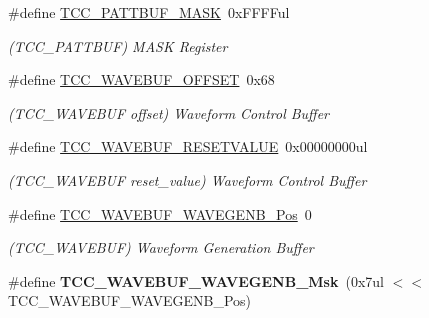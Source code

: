 \begin{DoxyCompactItemize}
\item 
\hypertarget{group___s_a_m_l21___t_c_c_gabbd3e6ebf10aa142b53d2ef5da3777bc}{}\#define \hyperlink{group___s_a_m_l21___t_c_c_gabbd3e6ebf10aa142b53d2ef5da3777bc}{T\+C\+C\+\_\+\+P\+A\+T\+T\+B\+U\+F\+\_\+\+M\+A\+S\+K}~0x\+F\+F\+F\+Ful\label{group___s_a_m_l21___t_c_c_gabbd3e6ebf10aa142b53d2ef5da3777bc}

\begin{DoxyCompactList}\small\item\em (T\+C\+C\+\_\+\+P\+A\+T\+T\+B\+U\+F) M\+A\+S\+K Register \end{DoxyCompactList}\item 
\hypertarget{group___s_a_m_l21___t_c_c_gae904588e02c9fc7371bdaa4c0c83fbce}{}\#define \hyperlink{group___s_a_m_l21___t_c_c_gae904588e02c9fc7371bdaa4c0c83fbce}{T\+C\+C\+\_\+\+W\+A\+V\+E\+B\+U\+F\+\_\+\+O\+F\+F\+S\+E\+T}~0x68\label{group___s_a_m_l21___t_c_c_gae904588e02c9fc7371bdaa4c0c83fbce}

\begin{DoxyCompactList}\small\item\em (T\+C\+C\+\_\+\+W\+A\+V\+E\+B\+U\+F offset) Waveform Control Buffer \end{DoxyCompactList}\item 
\hypertarget{group___s_a_m_l21___t_c_c_ga38a4ff54c2b170fb70df2ceb6c0d87ee}{}\#define \hyperlink{group___s_a_m_l21___t_c_c_ga38a4ff54c2b170fb70df2ceb6c0d87ee}{T\+C\+C\+\_\+\+W\+A\+V\+E\+B\+U\+F\+\_\+\+R\+E\+S\+E\+T\+V\+A\+L\+U\+E}~0x00000000ul\label{group___s_a_m_l21___t_c_c_ga38a4ff54c2b170fb70df2ceb6c0d87ee}

\begin{DoxyCompactList}\small\item\em (T\+C\+C\+\_\+\+W\+A\+V\+E\+B\+U\+F reset\+\_\+value) Waveform Control Buffer \end{DoxyCompactList}\item 
\hypertarget{group___s_a_m_l21___t_c_c_ga873098e9f57606f2bb54409caa7482f9}{}\#define \hyperlink{group___s_a_m_l21___t_c_c_ga873098e9f57606f2bb54409caa7482f9}{T\+C\+C\+\_\+\+W\+A\+V\+E\+B\+U\+F\+\_\+\+W\+A\+V\+E\+G\+E\+N\+B\+\_\+\+Pos}~0\label{group___s_a_m_l21___t_c_c_ga873098e9f57606f2bb54409caa7482f9}

\begin{DoxyCompactList}\small\item\em (T\+C\+C\+\_\+\+W\+A\+V\+E\+B\+U\+F) Waveform Generation Buffer \end{DoxyCompactList}\item 
\hypertarget{group___s_a_m_l21___t_c_c_ga801722f16eb39fd6ff0afdf426df9f58}{}\#define {\bfseries T\+C\+C\+\_\+\+W\+A\+V\+E\+B\+U\+F\+\_\+\+W\+A\+V\+E\+G\+E\+N\+B\+\_\+\+Msk}~(0x7ul $<$$<$ T\+C\+C\+\_\+\+W\+A\+V\+E\+B\+U\+F\+\_\+\+W\+A\+V\+E\+G\+E\+N\+B\+\_\+\+Pos)\label{group___s_a_m_l21___t_c_c_ga801722f16eb39fd6ff0afdf426df9f58}


\end{DoxyCompactItemize}
